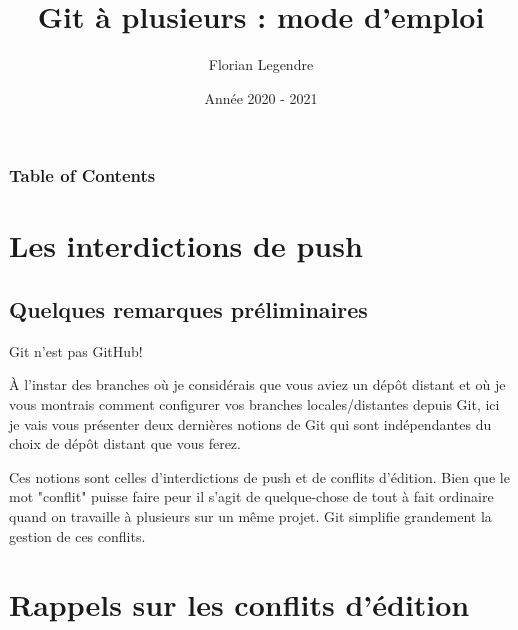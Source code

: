 \documentclass{beamer}
\title[Git collaboratif]{Git à plusieurs : mode d'emploi}
\author{Florian Legendre}
\institute{Université de Poitiers}
\date{Année 2020 - 2021}
\begin{document}
\frame{\titlepage}

\begin{frame}
\frametitle{Table of Contents}
\tableofcontents[hideallsubsections]
\end{frame}



\section{Les interdictions de push}

\subsection{Quelques remarques préliminaires}
\begin{frame}{Git n'est pas GitHub!}

À l'instar des branches où je considérais que vous aviez un dépôt distant et où je vous  montrais comment configurer vos branches locales/distantes depuis Git, ici je vais vous présenter deux dernières notions de Git qui sont indépendantes du choix de dépôt distant que vous ferez.\\
\medskip

Ces notions sont celles d'interdictions de push et de conflits d'édition. Bien que le mot "conflit" puisse faire peur il s'agit de quelque-chose de tout à fait ordinaire quand on travaille à plusieurs sur un même projet. Git simplifie grandement la gestion de ces conflits.\\

\end{frame}





\section{Rappels sur les conflits d'édition}
\end{document}
